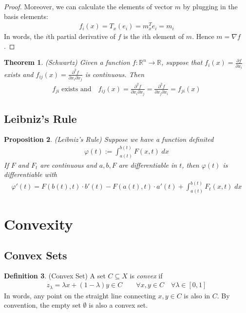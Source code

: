 \documentclass[12pt]{article}
\numberwithin{equation}{section} %
\theoremstyle{plain}
\newtheorem{thm}{Theorem}[section]
\newtheorem{prop}[thm]{Proposition}
\theoremstyle{definition}
\newtheorem{defn}[thm]{Definition}
\theoremstyle{remark}
\newcommand{\R}{\mathbb{R}}
\newcommand{\Rn}{\mathbb{R}^n}
\begin{document}
\begin{proof}
Moreover, we can calculate the elements of vector $m$ by plugging in the
basis elements:
\begin{align*}
  f_i(x) = T_x(e_i) = m^T_x e_i = m_i
\end{align*}
In words, the $i$th partial derivative of $f$ is the $i$th element of
$m$. Hence $m = \nabla f$.
\end{proof}

\begin{thm}{\emph{(Schwartz)}}
Given a function $f:\Rn\rightarrow\R$, suppose that
$f_i(x)=\frac{\partial f}{\partial x_i}$ exists and
$f_{ij}(x)=\frac{\partial^2 f}{\partial x_i\partial x_j}$ is continuous.
Then
\begin{align*}
  f_{ji} \; \text{exists and} \quad
  f_{ij}(x)=\frac{\partial^2 f}{\partial x_i\partial x_j}
  = \frac{\partial^2 f}{\partial x_j\partial x_i} = f_{ji}(x)
\end{align*}
\end{thm}

\clearpage
\subsection{Leibniz's Rule}

\begin{prop}\emph{(Leibniz's Rule)}
Suppose we have a function definited
\begin{align*}
  \varphi(t) := \int^{b(t)}_{a(t)} F(x,t) \; dx
\end{align*}
If $F$ and $F_t$ are continuous and $a,b,F$ are differentiable in $t$,
then $\varphi(t)$ is differentiable with
\begin{align*}
  \varphi'(t)
  = F(b(t),t)\cdot b'(t) - F(a(t),t)\cdot a'(t)
  + \int^{b(t)}_{a(t)} F_t(x,t) \; dx
\end{align*}
\end{prop}



\clearpage
\section{Convexity}

\subsection{Convex Sets}

\begin{defn}{(Convex Set)}
\label{defn:convexset}
A set $C\subseteq X$ is \emph{convex} if
\begin{align*}
  z_\lambda = \lambda x + (1-\lambda) y \in C
  \qquad \forall x,y\in C\quad \forall \lambda \in [0,1]
\end{align*}
In words, any point on the straight line connecting $x,y\in C$ is also
in $C$. By convention, the empty set $\emptyset$ is also a convex set.
\end{defn}
\end{document}
